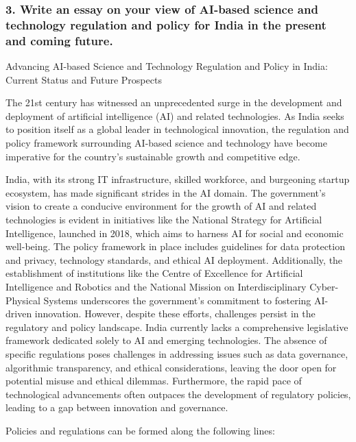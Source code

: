 \documentclass{report}
\begin{document}
\subsubsection*{3. Write an essay on your view of AI-based science and technology
regulation and policy for India in the present and coming future.}
\begin{center}
  Advancing AI-based Science and Technology Regulation and Policy in India: Current Status and Future Prospects
\end{center}

The 21st century has witnessed an unprecedented surge in the development and deployment 
of artificial intelligence (AI) and related technologies. As India seeks to position itself 
as a global leader in technological innovation, the regulation and policy framework surrounding 
AI-based science and technology have become imperative for the country's sustainable growth and 
competitive edge. 

India, with its strong IT infrastructure, skilled workforce, and burgeoning startup ecosystem, 
has made significant strides in the AI domain. The government's vision to create a conducive 
environment for the growth of AI and related technologies is evident in initiatives like 
the National Strategy for Artificial Intelligence, launched in 2018, which aims to harness 
AI for social and economic well-being. The policy framework in place includes guidelines for data protection 
and privacy, technology standards, and ethical AI deployment. Additionally, the establishment of institutions 
like the Centre of Excellence for Artificial Intelligence and Robotics and the National Mission on Interdisciplinary 
Cyber-Physical Systems underscores the government's commitment to fostering AI-driven innovation.
However, despite these efforts, challenges persist in the regulatory and policy landscape. 
India currently lacks a comprehensive legislative framework dedicated solely to AI and emerging 
technologies. The absence of specific regulations poses challenges in addressing issues such as 
data governance, algorithmic transparency, and ethical considerations, leaving the door open 
for potential misuse and ethical dilemmas. Furthermore, the rapid pace of technological advancements 
often outpaces the development of regulatory policies, leading to a gap between innovation and governance.

Policies and regulations can be formed along the following lines:
\end{document}
